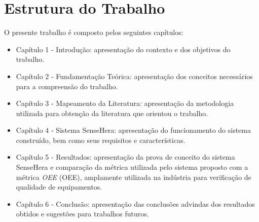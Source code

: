 \section{Estrutura do Trabalho}
\null \quad O presente trabalho é composto pelos seguintes capítulos:
\begin{itemize}
  \item Capítulo 1 - Introdução: apresentação do contexto e dos objetivos do trabalho.
  \item Capítulo 2 - Fundamentação Teórica: apresentação dos conceitos necessários para a compreensão do
  trabalho.
  \item Capítulo 3 - Mapeamento da Literatura: apresentação da metodologia utilizada para obtenção da literatura que orientou o trabalho.
  \item Capítulo 4 - Sistema SenseHera: apresentação do funcionamento do sistema construído, bem como seus requisitos e características.
  \item Capítulo 5 - Resultados: apresentação da prova de conceito do sistema SenseHera e comparação da métrica utilizada pelo sistema proposto com a métrica \textit{\acrlong{OEE}} (\acrshort{OEE}), amplamente utilizada na indústria para verificação de qualidade de equipamentos.
  \item Capítulo 6 - Conclusão: apresentação das conclusões advindas dos resultados obtidos e
  sugestões para trabalhos futuros.
\end{itemize}
